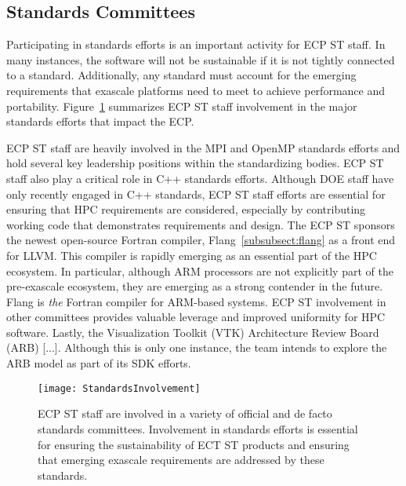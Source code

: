 \newpage
\subsection{Standards Committees}
Participating in standards efforts is an important activity for ECP ST staff.  In many instances, the software will not be sustainable if it is not tightly connected to a standard. Additionally, any standard must account for the emerging requirements that exascale platforms need to meet to achieve performance and portability. Figure~\ref{fig:standards} summarizes ECP ST staff involvement in the major standards efforts that impact the ECP.

ECP ST staff are heavily involved in the MPI and OpenMP standards efforts and hold several key leadership positions within the standardizing bodies. ECP ST staff also play a critical role in C++ standards efforts. Although DOE staff have only recently engaged in C++ standards, ECP ST staff efforts are essential for ensuring that HPC requirements are considered, especially by contributing working code that demonstrates requirements and design. The ECP ST sponsors the newest open-source Fortran compiler, Flang~\ref{subsubsect:flang} as a front end for LLVM.  This compiler is rapidly emerging as an essential part of the HPC ecosystem.  In particular, although ARM processors are not explicitly part of the pre-exascale ecosystem, they are emerging as a strong contender in the future.  Flang is \textit{the} Fortran compiler for ARM-based systems.  ECP ST involvement in other committees provides valuable leverage and improved uniformity for HPC software.  Lastly, the Visualization Toolkit (VTK) Architecture Review Board (ARB) [...].  Although this is only one instance, the team intends to explore the ARB model as part of its SDK efforts.
\begin{figure}[htb]
	\begin{center}
		\texttt{[image: StandardsInvolvement]}
		
		\caption{\label{fig:standards} ECP ST staff are involved in a variety of official and de facto standards committees.  Involvement in standards efforts is essential for ensuring the sustainability of ECT ST products and ensuring that emerging exascale requirements are addressed by these standards.}
	\end{center}
\end{figure}

